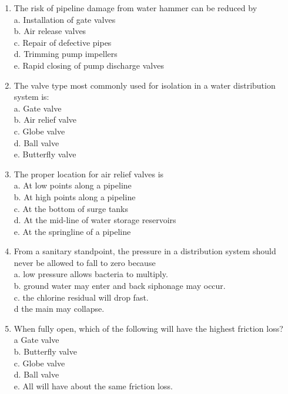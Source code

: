 \documentclass{article}
\begin{document}
\begin{enumerate}[1.]
\item The risk of pipeline damage from water hammer can be reduced by\\ 
a.	Installation of gate valves\\
b.	Air release valves\\
c.	Repair of defective pipes\\
d.	Trimming pump impellers\\
e.	Rapid closing of pump discharge valves

\item The valve type most commonly used for isolation in a water distribution system is:\\
a.	Gate valve\\
b.	Air relief valve\\
c.	Globe valve\\
d.	Ball valve\\
e.	Butterfly valve

\item The proper location for air relief valves is\\
a.	At low points along a pipeline\\
b.	At high points along a pipeline\\
c.	At the bottom of surge tanks\\
d.	At the mid-line of water storage reservoirs\\
e.	At the springline of a pipeline

\item From a sanitary standpoint, the pressure in a distribution system should never be allowed to fall to zero because\\
a.	low pressure allows bacteria to multiply.\\
b.	ground water may enter and back siphonage may occur.\\
c.	the chlorine residual will drop fast.\\
d	the main may collapse.\\

\item When fully open, which of the following will have the highest friction loss?\\
a	Gate valve\\
b.	Butterfly valve\\
c.	Globe valve\\
d.	Ball valve\\
e.	All will have about the same friction loss.\\


\end{enumerate}
\end{document}
